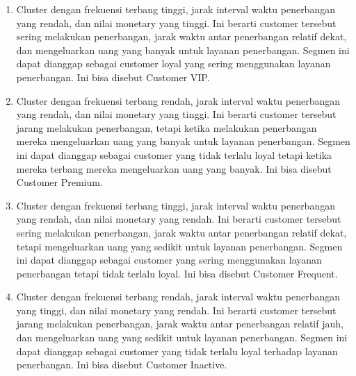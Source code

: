 \begin{enumerate}
    \item Cluster dengan frekuensi terbang tinggi, jarak interval waktu penerbangan yang rendah, dan nilai monetary yang tinggi. Ini berarti customer tersebut sering melakukan penerbangan, jarak waktu antar penerbangan relatif dekat, dan mengeluarkan uang yang banyak untuk layanan penerbangan. Segmen ini dapat dianggap sebagai customer loyal yang sering menggunakan layanan penerbangan. Ini bisa disebut Customer VIP.
    \item Cluster dengan frekuensi terbang rendah, jarak interval waktu penerbangan yang rendah, dan nilai monetary yang tinggi. Ini berarti customer tersebut jarang melakukan penerbangan, tetapi ketika melakukan penerbangan mereka mengeluarkan uang yang banyak untuk layanan penerbangan. Segmen ini dapat dianggap sebagai customer yang tidak terlalu loyal tetapi ketika mereka terbang mereka mengeluarkan uang yang banyak. Ini bisa disebut Customer Premium.
    \item Cluster dengan frekuensi terbang tinggi, jarak interval waktu penerbangan yang rendah, dan nilai monetary yang rendah. Ini berarti customer tersebut sering melakukan penerbangan, jarak waktu antar penerbangan relatif dekat, tetapi mengeluarkan uang yang sedikit untuk layanan penerbangan. Segmen ini dapat dianggap sebagai customer yang sering menggunakan layanan penerbangan tetapi tidak terlalu loyal. Ini bisa disebut Customer Frequent.
    \item Cluster dengan frekuensi terbang rendah, jarak interval waktu penerbangan yang tinggi, dan nilai monetary yang rendah. Ini berarti customer tersebut jarang melakukan penerbangan, jarak waktu antar penerbangan relatif jauh, dan mengeluarkan uang yang sedikit untuk layanan penerbangan. Segmen ini dapat dianggap sebagai customer yang tidak terlalu loyal terhadap layanan penerbangan. Ini bisa disebut Customer Inactive.
\end{enumerate}





